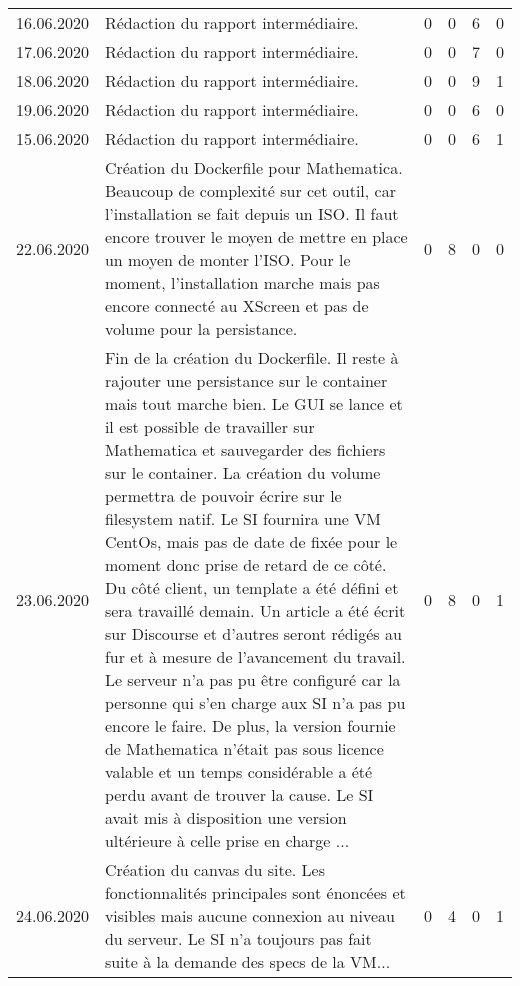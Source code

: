 \begin{landscape}
\begin{longtable}[c]{lp{10cm}rrrr}
	16.06.2020
	& Rédaction du rapport intermédiaire.
	& 0 %
	& 0 %
	& 6 %
	& 0\\ %
	
	17.06.2020
	& Rédaction du rapport intermédiaire.
	& 0 %
	& 0 %
	& 7 %
	& 0\\ %
	
	18.06.2020
	& Rédaction du rapport intermédiaire.
	& 0 %
	& 0 %
	& 9 %
	& 1\\ %
	
	19.06.2020
	& Rédaction du rapport intermédiaire.
	& 0 %
	& 0 %
	& 6 %
	& 0\\ %
	
	15.06.2020
	& Rédaction du rapport intermédiaire.
	& 0 %
	& 0 %
	& 6 %
	& 1\\ %
	
	22.06.2020
	& Création du Dockerfile pour Mathematica. Beaucoup de complexité sur cet outil, car l'installation se fait depuis un ISO. Il faut encore trouver le moyen de mettre en place un moyen de monter l'ISO. Pour le moment, l'installation marche mais pas encore connecté au XScreen et pas de volume pour la persistance.
	& 0 %
	& 8 %
	& 0 %
	& 0\\ %
	
	23.06.2020
	& Fin de la création du Dockerfile. Il reste à rajouter une persistance sur le container mais tout marche bien. Le GUI se lance et il est possible de travailler sur Mathematica et sauvegarder des fichiers sur le container. La création du volume permettra de pouvoir écrire sur le filesystem natif. Le SI fournira une VM CentOs, mais pas de date de fixée pour le moment donc prise de retard de ce côté. Du côté client, un template a été défini et sera travaillé demain. Un article a été écrit sur Discourse et d'autres seront rédigés au fur et à mesure de l'avancement du travail. Le serveur n'a pas pu être configuré car la personne qui s'en charge  aux SI n'a pas pu encore le faire. De plus, la version fournie de Mathematica n'était pas sous licence valable et un temps considérable a été perdu avant de trouver la cause. Le SI avait mis à disposition une version ultérieure à celle prise en charge ... 
	& 0 %
	& 8 %
	& 0 %
	& 1\\ %
	
	24.06.2020
	& Création du canvas du site. Les fonctionnalités principales sont énoncées et visibles mais aucune connexion au niveau du serveur. Le SI n'a toujours pas fait suite à la demande des specs de la VM...
	& 0 %
	& 4 %
	& 0 %
	& 1\\ %
	

\end{longtable}
\end{landscape}
